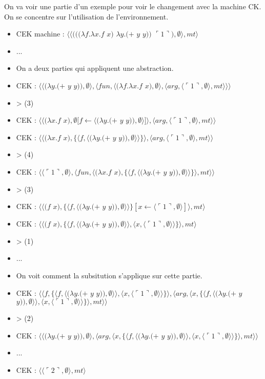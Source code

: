 \documentclass[10pt,a4paper]{report}
\begin{document}
On va voir une partie d'un exemple pour voir le changement avec la machine CK. On se concentre sur l'utilisation de l'environnement.
\medbreak

\begin{itemize}
\item[] CEK machine : $\langle\langle(((\lambda f.\lambda x.f$ $x)$ $\lambda y.(+$ $y$ $y))$ $\ulcorner 1\urcorner),\emptyset\rangle,mt\rangle$
\item[] ...
\item[] On a deux parties qui appliquent une abstraction.
\item[] CEK : $\langle\langle(\lambda y.(+$ $y$ $y)),\emptyset\rangle,\langle fun,\langle(\lambda f.\lambda x.f$ $x),\emptyset\rangle,\langle arg,\langle\ulcorner 1\urcorner,\emptyset\rangle,mt\rangle\rangle\rangle$
\item[] > (3) 
\item[] CEK : $\langle\langle(\lambda x.f$ $x),\emptyset[f \leftarrow \langle(\lambda y.(+$ $y$ $y)),\emptyset\rangle]\rangle,\langle arg,\langle\ulcorner 1\urcorner,\emptyset\rangle,mt\rangle\rangle$
\item[] CEK : $\langle\langle(\lambda x.f$ $x),\{\langle f,\langle(\lambda y.(+$ $y$ $y)),\emptyset\rangle\rangle\}\rangle,\langle arg,\langle\ulcorner 1\urcorner,\emptyset\rangle,mt\rangle\rangle$
\item[] > (4) 
\item[] CEK : $\langle\langle\ulcorner 1\urcorner,\emptyset\rangle,\langle fun,\langle(\lambda x.f$ $x),\{\langle f,\langle(\lambda y.(+$ $y$ $y)),\emptyset\rangle\rangle\}\rangle,mt\rangle\rangle$
\item[] > (3) 
\item[] CEK : $\langle\langle(f$ $x),\{\langle f,\langle(\lambda y.(+$ $y$ $y)),\emptyset\rangle\rangle\}[x \leftarrow \langle\ulcorner 1\urcorner,\emptyset\rangle]\rangle,mt\rangle$
\item[] CEK : $\langle\langle(f$ $x),\{\langle f,\langle(\lambda y.(+$ $y$ $y)),\emptyset\rangle\rangle,\langle x,\langle\ulcorner 1\urcorner,\emptyset\rangle\rangle\}\rangle,mt\rangle$
\item[] > (1)
\item[] ...
\item[] On voit comment la subsitution s'applique sur cette partie.
\item[] CEK : $\langle\langle f,\{\langle f,\langle(\lambda y.(+$ $y$ $y)),\emptyset\rangle\rangle,\langle x,\langle\ulcorner 1\urcorner,\emptyset\rangle\rangle\}\rangle,\langle arg,\langle x,\{\langle f,\langle(\lambda y.(+$ $y$ $y)),\emptyset\rangle\rangle,\langle x,\langle\ulcorner 1\urcorner,\emptyset\rangle\rangle\}\rangle,mt\rangle\rangle$
\item[] > (2) 
\item[] CEK : $\langle\langle(\lambda y.(+$ $y$ $y)),\emptyset\rangle,\langle arg,\langle x,\{\langle f,\langle(\lambda y.(+$ $y$ $y)),\emptyset\rangle\rangle,\langle x,\langle\ulcorner 1\urcorner,\emptyset\rangle\rangle\}\rangle,mt\rangle\rangle$
\item[] ...
\item[] CEK : $\langle\langle\ulcorner 2\urcorner,\emptyset\rangle,mt\rangle$
\end{itemize}
\medbreak
\end{document}
